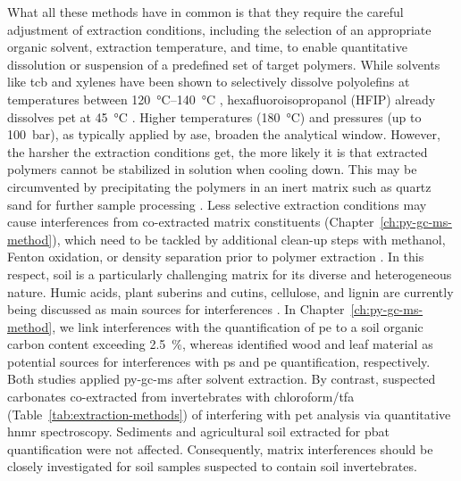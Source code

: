 What all these methods have in common is that they require the careful adjustment of extraction conditions, including the selection of an appropriate organic solvent, extraction temperature, and time, to enable quantitative dissolution or suspension of a predefined set of target polymers. While solvents like \ac{tcb} and xylenes have been shown to selectively dissolve polyolefins at temperatures between \SIrange[range-phrase = { and }]{120}{140}{\degreeCelsius} \citep[Chapter~\ref{ch:py-gc-ms-method};][]{CeccariniHidden2018}, hexafluoroisopropanol (HFIP)
already dissolves \ac{pet} at \SI{45}{\degreeCelsius} \citep{ElertComparison2017}. Higher temperatures
(\SI{180}{\degreeCelsius}) and pressures (up to \SI{100}{\bar}), as typically applied by \ac{ase},
broaden the analytical window. However, the harsher the extraction conditions get, the more likely it is that extracted polymers cannot be stabilized in solution when cooling down. This may be circumvented by precipitating the polymers in an inert matrix such as quartz sand for further sample processing \citep{DierkesQuantification2019}. Less selective extraction conditions may cause interferences from co-extracted matrix constituents (Chapter~\ref{ch:py-gc-ms-method}), which need to be tackled by additional clean-up steps with methanol, Fenton oxidation, or density separation prior to polymer extraction \citep{DierkesQuantification2019,PeezQuantitative2019}. In this respect, soil is a particularly challenging matrix for its diverse and heterogeneous nature. Humic acids, plant suberins and cutins, cellulose,
and lignin are currently being discussed as main sources for interferences \citep[Chapter~\ref{ch:py-gc-ms-method};][]{DierkesQuantification2019,OkoffoIdentification2020}. In Chapter~\ref{ch:py-gc-ms-method}, we link interferences with the quantification of \ac{pe} to a soil organic carbon content exceeding \SI{2.5}{\percent}, whereas \citet{DierkesQuantification2019} identified wood and leaf material as potential sources for interferences with \ac{ps} and \ac{pe}
quantification, respectively. Both studies applied \ac{py-gc-ms} after solvent extraction. By contrast, \citet{PeezQuantitative2019} suspected carbonates co-extracted from invertebrates with chloroform\slash\ac{tfa}
(Table~\ref{tab:extraction-methods}) of interfering with \ac{pet} analysis via quantitative \ac{hnmr} spectroscopy.
Sediments \citep{PeezQuantitative2019} and agricultural soil extracted for \ac{pbat}
quantification \citep{NelsonQuantification2019} were not affected. Consequently,
matrix interferences should be closely investigated for soil samples suspected to contain soil invertebrates.

